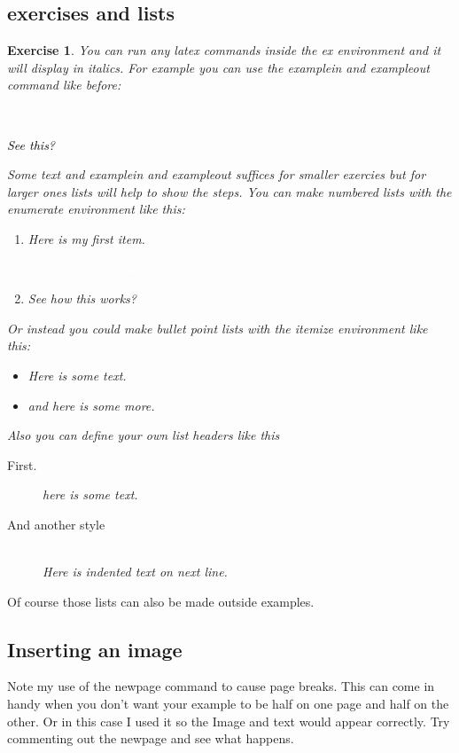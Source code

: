 \documentclass{book}
\newcommand{\examplein}[1]{\begin{center} \colorbox{Dark}{\textcolor{white}{#1}} \end{center}}
\newcommand{\exampleout}[1]{\begin{center} \colorbox{Light}{\textcolor{black}{#1}} \end{center}}
\newtheorem{ex}{Exercise}[chapter]
\begin{document}
\subsection{exercises and lists}
\begin{ex} 
	You can run any latex commands inside the ex environment and it will display in italics. For example you can use the examplein and exampleout command like before:
	\examplein{do this}
	\exampleout{See this?}
	Some text and examplein and exampleout suffices for smaller exercies but for larger ones lists will help to show the steps. You can make numbered lists with the enumerate environment like this:
\begin{enumerate}
	\item Here is my first item. \examplein{it contains an example}
	\item See how this works?
\end{enumerate}
	Or instead you could make bullet point lists with the itemize environment like this:
	\begin{itemize}
		\item Here is some text.
		\item and here is some more.
	\end{itemize}
	Also you can define your own list headers like this
	\begin{description}
		\item[First.] here is some text.
		\item[And another style] \hfill \\
			Here is indented text on next line.
	\end{description}
\end{ex}
Of course those lists can also be made outside examples.

\subsection{Inserting an image}
\newpage
Note my use of the newpage command to cause page breaks. This can come in handy when you don't want your example to be half on one page and half on the other. Or in this case I used it so the Image and text would appear correctly. Try commenting out the newpage and see what happens. 
\end{document}
